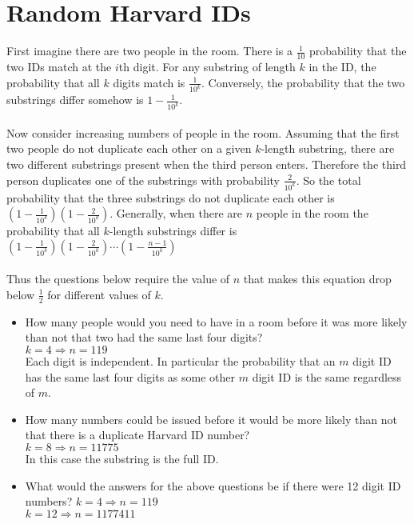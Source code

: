 \documentclass[11pt]{article}
\title{}
\author{}
\date{}                                           %
\begin{document}
\maketitle

\section{Random Harvard IDs}
First imagine there are two people in the room. There is a $\frac{1}{10}$ probability that the two IDs match at the $i$th digit. For any substring of length $k$ in the ID, the probability that all $k$ digits match is $\frac{1}{10^{k}}$. Conversely, the probability that the two substrings differ somehow is $1 - \frac{1}{10^{k}}$. \\
\\
Now consider increasing numbers of people in the room. Assuming that the first two people do not duplicate each other on a given $k$-length substring, there are two different substrings present when the third person enters. Therefore the third person duplicates one of the substrings with probability $\frac{2}{10^{k}}$. So the total probability that the three substrings do not duplicate each other is
$\left ( 1 - \frac{1}{10^{k}} \right )  \left (1 -  \frac{2}{10^{k}} \right )$. Generally, when there are $n$ people in the room the probability that all $k$-length substrings differ is $\left ( 1 - \frac{1}{10^{k}} \right )  \left (1 -  \frac{2}{10^{k}} \right ) \cdots  \left (1 - \frac{n-1}{10^{k}} \right )$
\\
\\
Thus the questions below require the value of $n$ that makes this equation drop below $\frac{1}{2}$ for different values of $k$.
\\
\begin{itemize}
\item How many people would you need to have in a room before it was more likely than not that two had the same last four digits? \\
$k = 4 \Rightarrow n = 119$ \\
Each digit is independent. In particular the probability that an $m$ digit ID has the same last four digits as some other $m$ digit ID is the same regardless of $m$.
\item How many numbers could be issued before it would be more likely than not that there is a duplicate Harvard ID number? \\
$k = 8 \Rightarrow n = 11775$ \\
In this case the substring is the full ID.
\item What would the answers for the above questions be if there were 12 digit ID numbers?
$k = 4 \Rightarrow n = 119$ \\
$k = 12 \Rightarrow n = 1177411$
\end{itemize}
\end{document}
